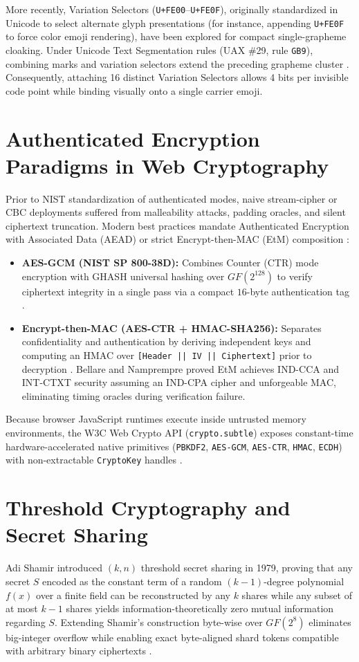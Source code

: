 \documentclass[12pt,a4paper,oneside,openany]{report}
\begin{document}
More recently, Variation Selectors (\texttt{U+FE00}--\texttt{U+FE0F}), originally standardized in Unicode to select alternate glyph presentations (for instance, appending \texttt{U+FE0F} to force color emoji rendering), have been explored for compact single-grapheme cloaking. Under Unicode Text Segmentation rules (UAX \#29, rule \texttt{GB9}), combining marks and variation selectors extend the preceding grapheme cluster \cite{unicode_uax29}. Consequently, attaching 16 distinct Variation Selectors allows 4 bits per invisible code point while binding visually onto a single carrier emoji.

\section{Authenticated Encryption Paradigms in Web Cryptography}
Prior to NIST standardization of authenticated modes, naive stream-cipher or CBC deployments suffered from malleability attacks, padding oracles, and silent ciphertext truncation. Modern best practices mandate Authenticated Encryption with Associated Data (AEAD) or strict Encrypt-then-MAC (EtM) composition \cite{nist_gcm}:
\begin{itemize}
    \item \textbf{AES-GCM (NIST SP 800-38D):} Combines Counter (CTR) mode encryption with GHASH universal hashing over $GF(2^{128})$ to verify ciphertext integrity in a single pass via a compact $16$-byte authentication tag \cite{nist_gcm}.
    \item \textbf{Encrypt-then-MAC (AES-CTR + HMAC-SHA256):} Separates confidentiality and authentication by deriving independent keys and computing an HMAC over \texttt{[Header || IV || Ciphertext]} prior to decryption \cite{rfc2104}. Bellare and Namprempre proved EtM achieves IND-CCA and INT-CTXT security assuming an IND-CPA cipher and unforgeable MAC, eliminating timing oracles during verification failure.
\end{itemize}
Because browser JavaScript runtimes execute inside untrusted memory environments, the W3C Web Crypto API (\texttt{crypto.subtle}) exposes constant-time hardware-accelerated native primitives (\texttt{PBKDF2}, \texttt{AES-GCM}, \texttt{AES-CTR}, \texttt{HMAC}, \texttt{ECDH}) with non-extractable \texttt{CryptoKey} handles \cite{w3c_webcrypto}.

\section{Threshold Cryptography and Secret Sharing}
Adi Shamir \cite{shamir1979} introduced $(k, n)$ threshold secret sharing in 1979, proving that any secret $S$ encoded as the constant term of a random $(k-1)$-degree polynomial $f(x)$ over a finite field can be reconstructed by any $k$ shares while any subset of at most $k-1$ shares yields information-theoretically zero mutual information regarding $S$. Extending Shamir's construction byte-wise over $GF(2^8)$ eliminates big-integer overflow while enabling exact byte-aligned shard tokens compatible with arbitrary binary ciphertexts \cite{nist_aes}.
\end{document}
